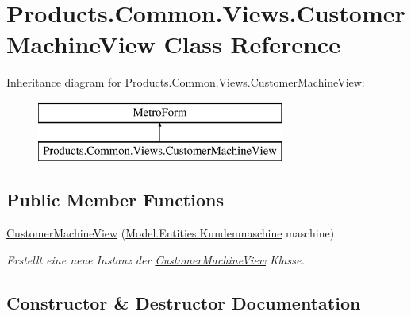 \hypertarget{class_products_1_1_common_1_1_views_1_1_customer_machine_view}{}\section{Products.\+Common.\+Views.\+Customer\+Machine\+View Class Reference}
\label{class_products_1_1_common_1_1_views_1_1_customer_machine_view}
Inheritance diagram for Products.\+Common.\+Views.\+Customer\+Machine\+View\+:\begin{figure}[H]
\begin{center}
\leavevmode
\includegraphics[height=2.000000cm]{class_products_1_1_common_1_1_views_1_1_customer_machine_view}
\end{center}
\end{figure}
\subsection*{Public Member Functions}
\begin{DoxyCompactItemize}
\item 
\hyperlink{class_products_1_1_common_1_1_views_1_1_customer_machine_view_aa38beb61930e63db9c22d9a6e2a7d091}{Customer\+Machine\+View} (\hyperlink{class_products_1_1_model_1_1_entities_1_1_kundenmaschine}{Model.\+Entities.\+Kundenmaschine} maschine)
\begin{DoxyCompactList}\small\item\em Erstellt eine neue Instanz der \hyperlink{class_products_1_1_common_1_1_views_1_1_customer_machine_view}{Customer\+Machine\+View} Klasse. \end{DoxyCompactList}\end{DoxyCompactItemize}


\subsection{Constructor \& Destructor Documentation}
